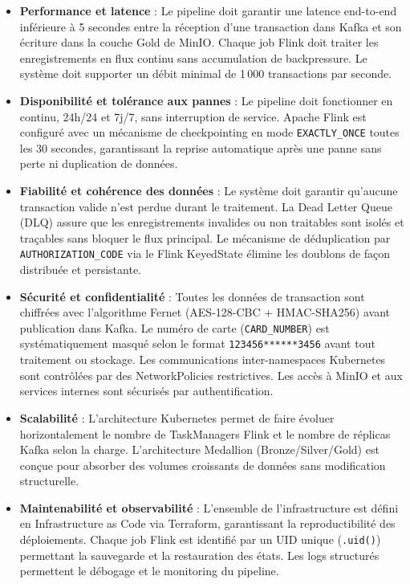 \vspace{0.3cm}
\begin{itemize}[leftmargin=1.5cm]

    \item \textbf{Performance et latence} : Le pipeline doit garantir une latence end-to-end inférieure à 5 secondes entre la réception d'une transaction dans Kafka et son écriture dans la couche Gold de MinIO. Chaque job Flink doit traiter les enregistrements en flux continu sans accumulation de backpressure. Le système doit supporter un débit minimal de 1\,000 transactions par seconde.

    \item \textbf{Disponibilité et tolérance aux pannes} : Le pipeline doit fonctionner en continu, 24h/24 et 7j/7, sans interruption de service. Apache Flink est configuré avec un mécanisme de checkpointing en mode \texttt{EXACTLY\_ONCE} toutes les 30 secondes, garantissant la reprise automatique après une panne sans perte ni duplication de données.

    \item \textbf{Fiabilité et cohérence des données} : Le système doit garantir qu'aucune transaction valide n'est perdue durant le traitement. La Dead Letter Queue (DLQ) assure que les enregistrements invalides ou non traitables sont isolés et traçables sans bloquer le flux principal. Le mécanisme de déduplication par \texttt{AUTHORIZATION\_CODE} via le Flink KeyedState élimine les doublons de façon distribuée et persistante.

    \item \textbf{Sécurité et confidentialité} : Toutes les données de transaction sont chiffrées avec l'algorithme Fernet (AES-128-CBC + HMAC-SHA256) avant publication dans Kafka. Le numéro de carte (\texttt{CARD\_NUMBER}) est systématiquement masqué selon le format \texttt{123456******3456} avant tout traitement ou stockage. Les communications inter-namespaces Kubernetes sont contrôlées par des NetworkPolicies restrictives. Les accès à MinIO et aux services internes sont sécurisés par authentification.

    \item \textbf{Scalabilité} : L'architecture Kubernetes permet de faire évoluer horizontalement le nombre de TaskManagers Flink et le nombre de réplicas Kafka selon la charge. L'architecture Medallion (Bronze/Silver/Gold) est conçue pour absorber des volumes croissants de données sans modification structurelle.

    \item \textbf{Maintenabilité et observabilité} : L'ensemble de l'infrastructure est défini en Infrastructure as Code via Terraform, garantissant la reproductibilité des déploiements. Chaque job Flink est identifié par un UID unique (\texttt{.uid()}) permettant la sauvegarde et la restauration des états. Les logs structurés permettent le débogage et le monitoring du pipeline.


\end{itemize}
